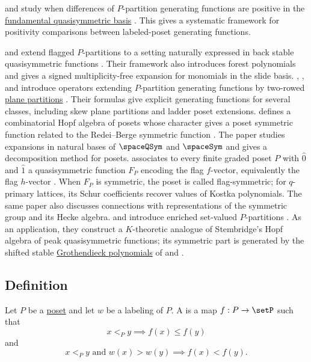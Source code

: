  and  study when
differences of $P$-partition generating functions are positive in the
\hyperref[gessel]{fundamental quasisymmetric basis}
\cite{LesnevichMcNamara2022}.  This gives a systematic framework for
positivity comparisons between labeled-poset generating functions.

 and  extend flagged
$P$-partitions to a setting naturally expressed in back stable
quasisymmetric functions \cite{NadeauTewari2023PPartitions}.  Their framework
also introduces forest polynomials and gives a signed multiplicity-free expansion
for monomials in the slide basis.
, , and  introduce
operators extending $P$-partition generating functions by two-rowed
\hyperref[planePartitions]{plane partitions} \cite{LiLiuXin2024x}.
Their formulas give explicit generating
functions for several classes, including skew plane partitions and ladder
poset extensions.
 defines a combinatorial Hopf algebra of posets whose
character gives a poset symmetric function related to the Redei--Berge
symmetric function \cite{Mitrovic2025x}.  The paper studies expansions in
natural bases of $\spaceQSym$ and $\spaceSym$ and gives a decomposition
method for posets.
 associates to every finite graded poset $P$ with
$\hat{0}$ and $\hat{1}$ a quasisymmetric function $F_P$ encoding the flag
$f$-vector, equivalently the flag $h$-vector \cite{Stanley1996FlagSymmetric}.
When $F_P$ is symmetric, the poset is called flag-symmetric; for $q$-primary
lattices, its Schur coefficients recover values of Kostka polynomials.
The same paper also discusses connections with representations of the
symmetric group and its Hecke algebra.
 and  introduce enriched set-valued
$P$-partitions \cite{LewisMarberg2021}.  As an application, they construct a
$K$-theoretic analogue of Stembridge's Hopf algebra of peak quasisymmetric
functions; its symmetric part is generated by the shifted stable
\hyperref[grothendieck]{Grothendieck polynomials} of 
and .


\subsection[pPartitionDefinition]{Definition}

Let $P$ be a \hyperref[poset]{poset} and let $w$ be a labeling of $P$.
A \label{labeledPPartition} is a map
$f:P \to \setP$ such that
\[
x \lt_P y \implies f(x) \leq f(y)
\]
and 
\[
x \lt_P y \text{ and } w(x)\gt w(y) \implies f(x) \lt f(y).
\]

